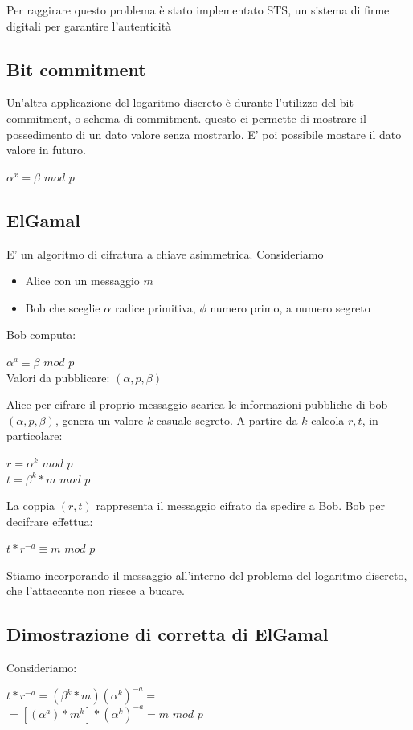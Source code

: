\documentclass[11pt, oneside]{article}   	%
\begin{document}
Per raggirare questo problema è stato implementato STS, un sistema di firme digitali per garantire l'autenticità


\subsection*{Bit commitment}
Un'altra applicazione del logaritmo discreto è durante l'utilizzo del bit commitment, o schema di commitment. questo ci permette di mostrare il possedimento di un dato valore senza mostrarlo. E' poi possibile mostare il dato valore in futuro.
\begin{center}
$\alpha^x = \beta$ $mod$ $p$
\end{center}

\subsection*{ElGamal}
E' un algoritmo di cifratura a chiave asimmetrica. Consideriamo \begin{itemize}
\item Alice con un messaggio $m$
\item Bob che sceglie $\alpha$ radice primitiva, $\phi$ numero primo, a numero segreto
\end{itemize}
Bob computa:
\begin{center}
$\alpha^a \equiv \beta$ $mod$ $p$\\
Valori da pubblicare: $(\alpha, p, \beta)$
\end{center}
Alice per cifrare il proprio messaggio scarica le informazioni pubbliche di bob $(\alpha, p, \beta)$, genera un valore $k$ casuale segreto. A partire da $k$ calcola $r,t$, in particolare:
\begin{center}
$r = \alpha^k$ $mod$ $p$\\
$t = \beta^k  * m$ $mod$ $p$
\end{center}
La coppia $(r,t)$ rappresenta il messaggio cifrato da spedire a Bob. Bob per decifrare effettua:
\begin{center}
$t * r^{-a} \equiv m$ $mod$ $p$
\end{center}
Stiamo incorporando il messaggio all'interno del problema del logaritmo discreto, che l'attaccante non riesce a bucare.
\subsection*{Dimostrazione di corretta di ElGamal}
Consideriamo: \begin{center}
$t * r^{-a} = (\beta^k * m)(\alpha^k)^{-a}=$\\
$= [(\alpha^a)*m^k]*(\alpha^k)^{-a} = m$ $mod$ $p$
\end{center}
\end{document}
